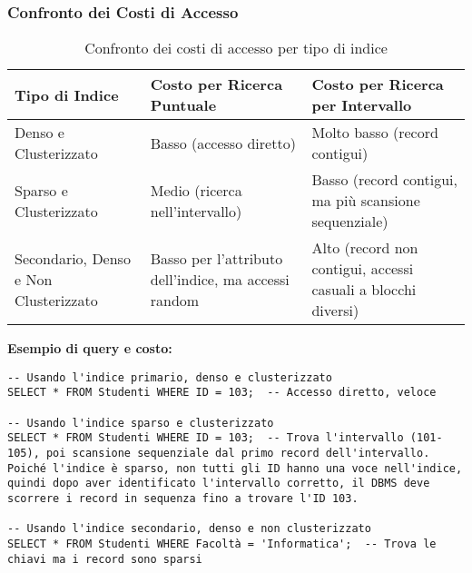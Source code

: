 \subsubsection{Confronto dei Costi di Accesso}

\begin{table}[H]
\centering
\begin{tabular}{|p{4cm}|p{4cm}|p{4cm}|}
\hline
\textbf{Tipo di Indice} & \textbf{Costo per Ricerca Puntuale} & \textbf{Costo per Ricerca per Intervallo} \\
\hline
Denso e Clusterizzato & Basso (accesso diretto) & Molto basso (record contigui) \\
\hline
Sparso e Clusterizzato & Medio (ricerca nell'intervallo) & Basso (record contigui, ma più scansione sequenziale) \\
\hline
Secondario, Denso e Non Clusterizzato & Basso per l'attributo dell'indice, ma accessi random & Alto (record non contigui, accessi casuali a blocchi diversi) \\
\hline
\end{tabular}
\caption{Confronto dei costi di accesso per tipo di indice}
\end{table}

\textbf{Esempio di query e costo:}

\begin{verbatim}
-- Usando l'indice primario, denso e clusterizzato
SELECT * FROM Studenti WHERE ID = 103;  -- Accesso diretto, veloce

-- Usando l'indice sparso e clusterizzato
SELECT * FROM Studenti WHERE ID = 103;  -- Trova l'intervallo (101-105), poi scansione sequenziale dal primo record dell'intervallo. Poiché l'indice è sparso, non tutti gli ID hanno una voce nell'indice, quindi dopo aver identificato l'intervallo corretto, il DBMS deve scorrere i record in sequenza fino a trovare l'ID 103.

-- Usando l'indice secondario, denso e non clusterizzato
SELECT * FROM Studenti WHERE Facoltà = 'Informatica';  -- Trova le chiavi ma i record sono sparsi
\end{verbatim}

